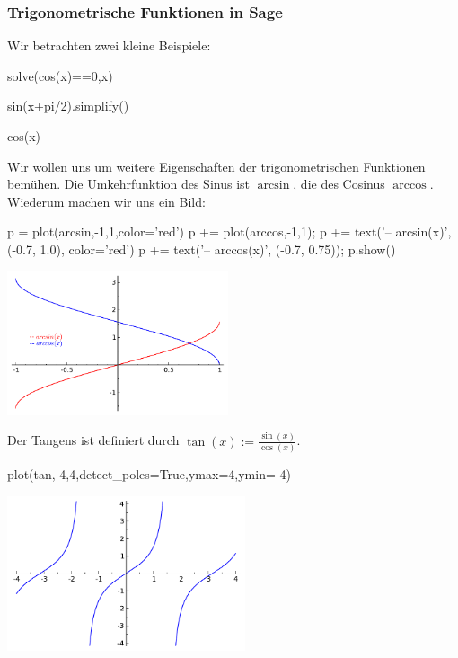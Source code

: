 \documentclass[fontsize=12pt,paper=a4,twoside,bibtotoc,idxtotoc,
liststotoc,pagesize,BCOR1.2cm,DIV15,chapterprefix,pagesize=pdftex]{scrbook}
\theoremstyle{plain}
\theoremstyle{definition}
\theoremstyle{remark}
\begin{document}
\subsubsection{Trigonometrische Funktionen in Sage}
Wir betrachten zwei kleine Beispiele:
\begin{sagein}
solve(cos(x)==0,x)
\end{sagein}
\begin{sage}
[x == 1/2*pi]
\end{sage}
\begin{sagein}
sin(x+pi/2).simplify()
\end{sagein}
\begin{sage}
cos(x)
\end{sage}
Wir wollen uns um weitere Eigenschaften der trigonometrischen Funktionen bemühen.
Die Umkehrfunktion des Sinus ist $\arcsin$, die des Cosinus $\arccos$. Wiederum machen wir uns ein Bild: 
\begin{sagein}
p = plot(arcsin,-1,1,color='red')
p += plot(arccos,-1,1); 
p += text('-- arcsin(x)', (-0.7, 1.0), color='red')
p += text('-- arccos(x)', (-0.7, 0.75)); p.show()
\end{sagein}
\begin{center}
\includegraphics[width=6.5cm]{arcsinarccos.pdf}
\end{center}
Der Tangens ist definiert durch
$\tan(x) :=\frac{\sin(x)}{\cos(x)}$.
\begin{sagein}
plot(tan,-4,4,detect_poles=True,ymax=4,ymin=-4)
\end{sagein}
\begin{center}
\includegraphics[width=7cm]{tan.pdf}
\end{center}
\end{document}
